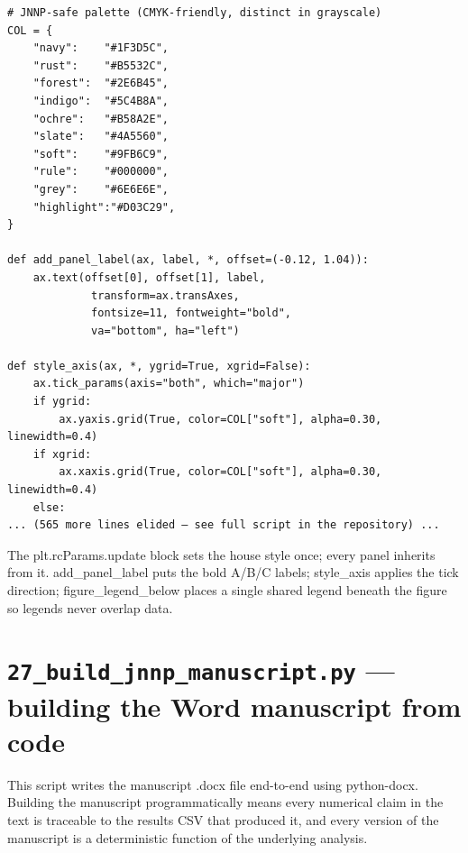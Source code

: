 \documentclass[11pt,a4paper]{article}
\begin{document}
\begin{lstlisting}[style=codeblock]
# JNNP-safe palette (CMYK-friendly, distinct in grayscale)
COL = {
    "navy":    "#1F3D5C",
    "rust":    "#B5532C",
    "forest":  "#2E6B45",
    "indigo":  "#5C4B8A",
    "ochre":   "#B58A2E",
    "slate":   "#4A5560",
    "soft":    "#9FB6C9",
    "rule":    "#000000",
    "grey":    "#6E6E6E",
    "highlight":"#D03C29",
}

def add_panel_label(ax, label, *, offset=(-0.12, 1.04)):
    ax.text(offset[0], offset[1], label,
             transform=ax.transAxes,
             fontsize=11, fontweight="bold",
             va="bottom", ha="left")

def style_axis(ax, *, ygrid=True, xgrid=False):
    ax.tick_params(axis="both", which="major")
    if ygrid:
        ax.yaxis.grid(True, color=COL["soft"], alpha=0.30, linewidth=0.4)
    if xgrid:
        ax.xaxis.grid(True, color=COL["soft"], alpha=0.30, linewidth=0.4)
    else:
... (565 more lines elided — see full script in the repository) ...
\end{lstlisting}

The plt.rcParams.update block sets the house style once; every panel inherits from it. add\_panel\_label puts the bold A/B/C labels; style\_axis applies the tick direction; figure\_legend\_below places a single shared legend beneath the figure so legends never overlap data.
\clearpage
\section{\texttt{27\_build\_jnnp\_manuscript.py} — building the Word manuscript from code}
This script writes the manuscript .docx file end-to-end using python-docx. Building the manuscript programmatically means every numerical claim in the text is traceable to the results CSV that produced it, and every version of the manuscript is a deterministic function of the underlying analysis.
\end{document}
